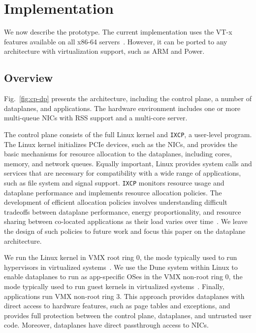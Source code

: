 
\section{\ix Implementation}
\label{sec:impl}




We now describe the \ix prototype.  The current implementation uses
the VT-x features available on all x86-64
servers~\cite{DBLP:journals/computer/UhligNRSMABKLS05}. However, it can
be ported to any architecture with virtualization support, such as ARM
and Power.

\subsection{Overview}
\label{sec:impl:overview}

Fig.~\ref{fig:cp-dp} presents the \ix architecture, including the
control plane, a number of dataplanes, and applications. The hardware
environment includes one or more multi-queue NICs with RSS support and
a multi-core server.

The \ix control plane consists of the full Linux kernel and
\texttt{IXCP}, a user-level program. The Linux kernel initializes PCIe
devices, such as the NICs, and provides the basic mechanisms for
resource allocation to the dataplanes, including cores, memory, and
network queues. Equally important, Linux provides system calls and
services that are necessary for compatibility with a wide range of
applications, such as file system and signal support. \texttt{IXCP}
monitors resource usage and dataplane performance and implements
resource allocation policies. The development of efficient allocation
policies involves understanding difficult tradeoffs between dataplane
performance, energy proportionality, and resource sharing between
co-located applications as their load varies over
time~\cite{DBLP:conf/eurosys/LeverichK14}. We leave the design of
such policies to future work and focus this paper on the \ix dataplane
architecture.

We run the Linux kernel in VMX root ring 0, the mode typically used to
run hypervisors in virtualized
systems~\cite{DBLP:journals/computer/UhligNRSMABKLS05}. We use the
Dune system within Linux to enable dataplanes to run as app-specific
OSes in the VMX non-root ring 0, the mode typically used to run guest
kernels in virtualized systems~\cite{dune}.
Finally, applications run VMX non-root ring 3. This approach provides
dataplanes with direct access to hardware features, such as page
tables and exceptions, and provides full protection between the
control plane, dataplanes, and untrusted user code. Moreover,
dataplanes have direct passthrough access to  NICs.


